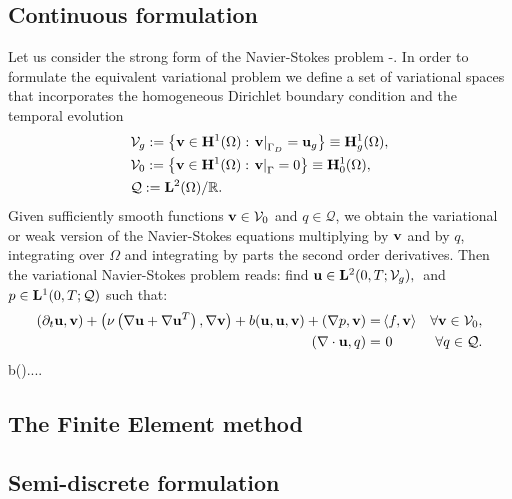 \subsection{Continuous formulation}
\label{subsec-variational_continuous}
Let us consider the strong form of the Navier-Stokes problem -. In order to formulate the equivalent variational problem we define a set of variational spaces that incorporates the homogeneous Dirichlet boundary condition and the temporal evolution
\begin{align}
\label{eq-NS_u_space}
&\mathcal{V}_g:=\left\{{\bf v}\in{\bf H}^1(\Omega):\left.{\bf v}\right|_{\Gamma_D}={\bf u}_g\right\}\equiv{\bf H}^1_g(\Omega),\\
\label{eq-NS_v_space}
&\mathcal{V}_0:=\left\{{\bf v}\in{\bf H}^1(\Omega):\left.{\bf v}\right|_\Gamma=0\right\}\equiv{\bf H}^1_0(\Omega),\\
\label{eq-NS_p_space}
&\mathcal{Q}:={\bf L}^2(\Omega)/\mathbb{R}.
\end{align}
Given sufficiently smooth functions $ {\bf v}\in\mathcal{V}_0 $ and $ q\in\mathcal{Q} $, we obtain the variational or weak version of the Navier-Stokes equations multiplying  by $ {\bf v} $  and  by $ q $, integrating over $ \Omega $ and integrating by parts the second order derivatives. Then the variational Navier-Stokes problem reads: find $ {\bf u}\in{\bf L}^2(0,T;\mathcal{V}_g),\\ $ and $ p\in{\bf L}^1(0,T;\mathcal{Q}) $ such that: 
\begin{align}
(\partial_t{\bf u},{\bf v})+\left(\nu\left(\nabla{\bf u}+\nabla{\bf u}^T\right),\nabla{\bf v}\right)+b({\bf u},{\bf u},{\bf v})+(\nabla p,{\bf v})=&\left\langle f,{\bf v}\right\rangle&\forall{\bf v}\in\mathcal{V}_0,\\
(\nabla\cdot{\bf u},q)=&\ 0&\forall q\in\mathcal{Q}.
\end{align}
b()....

\subsection{The Finite Element method}
\label{subsec-variational_finite_element}

\subsection{Semi-discrete formulation}
\label{subsec-variational_semidiscrete}

